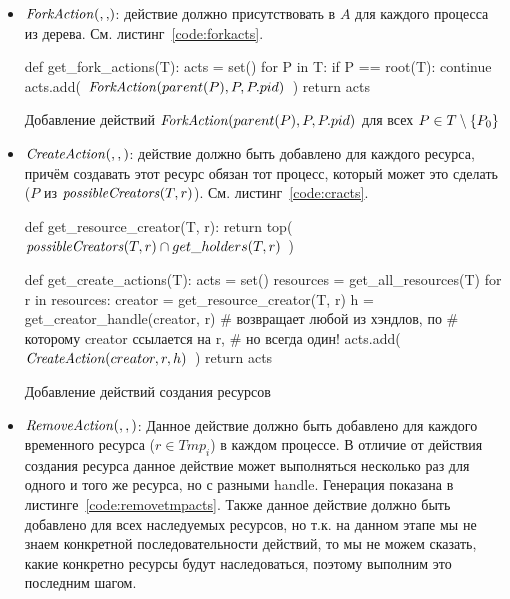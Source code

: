 \begin{itemize}
	\item $\crfork{}{}$: действие должно присутствовать в $A$ для каждого процесса из дерева. См. листинг~\ref{code:forkacts}.

\begin{listing}[ht!]
\begin{pythoncode}
def get_fork_actions(T):
    acts = set()
    for P in T:
        if P == root(T):
            continue
        acts.add(~$\crfork{parent(P)}{P}{P.pid}$~)
    return acts
\end{pythoncode}
\caption{Добавление действий $\crfork{parent(P)}{P}{P.pid}$ для всех $P \in T \setminus \xbrace{P_0}$}
\label{code:forkacts}
\end{listing}

	\item $\text{\textit{CreateAction}}(, , )$: действие должно быть добавлено для каждого ресурса, причём создавать этот ресурс обязан тот процесс, который может это сделать ($P$ из $\text{\textit{possibleCreators}}(T, r)$). См. листинг~\ref{code:cracts}.

\begin{listing}[ht!]
\begin{pythoncode}
def get_resource_creator(T, r):
    return top(~$\possibleCreators{T}{r} \cap get\_holders(T, r)$~)

def get_create_actions(T):
    acts = set()
    resources = get_all_resources(T)
    for r in resources:
        creator = get_resource_creator(T, r)
        h = get_creator_handle(creator, r)  # возвращает любой из хэндлов, по
                                            # которому creator ссылается на r, 
                                            # но всегда один!
        acts.add(~$\crcreate{creator}{r}{h}$~)
    return acts
\end{pythoncode}
\caption{Добавление действий создания ресурсов}
\label{code:cracts}
\end{listing}


	\item $\text{\textit{RemoveAction}}(, , )$: Данное действие должно быть добавлено для каждого временного ресурса ($r \in Tmp_i$) в каждом процессе. В отличие от действия создания ресурса данное действие может выполняться несколько раз для одного и того же ресурса, но с разными handle. Генерация показана в листинге~\ref{code:removetmpacts}. Также данное действие должно быть добавлено для всех наследуемых ресурсов, но т.к. на данном этапе мы не знаем конкретной последовательности действий, то мы не можем сказать, какие конкретно ресурсы будут наследоваться, поэтому выполним это последним шагом.  


\end{itemize}

